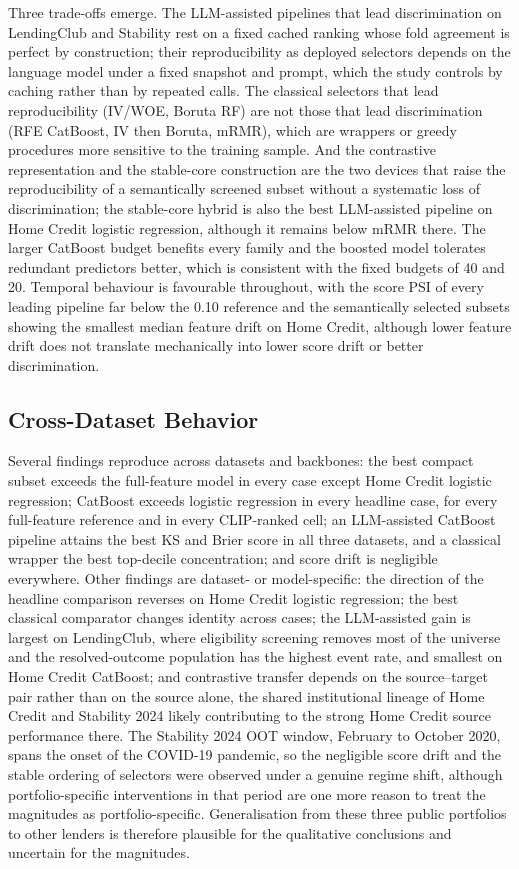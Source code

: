 \documentclass[final,5p,twocolumn]{elsarticle}
\begin{document}
Three trade-offs emerge. The LLM-assisted pipelines that lead discrimination on LendingClub and Stability rest on a fixed cached ranking whose fold agreement is perfect by construction; their reproducibility as deployed selectors depends on the language model under a fixed snapshot and prompt, which the study controls by caching rather than by repeated calls. The classical selectors that lead reproducibility (IV/WOE, Boruta RF) are not those that lead discrimination (RFE CatBoost, IV then Boruta, mRMR), which are wrappers or greedy procedures more sensitive to the training sample. And the contrastive representation and the stable-core construction are the two devices that raise the reproducibility of a semantically screened subset without a systematic loss of discrimination; the stable-core hybrid is also the best LLM-assisted pipeline on Home Credit logistic regression, although it remains below mRMR there. The larger CatBoost budget benefits every family and the boosted model tolerates redundant predictors better, which is consistent with the fixed budgets of 40 and 20. Temporal behaviour is favourable throughout, with the score PSI of every leading pipeline far below the 0.10 reference and the semantically selected subsets showing the smallest median feature drift on Home Credit, although lower feature drift does not translate mechanically into lower score drift or better discrimination.

\subsection{Cross-Dataset Behavior}
\label{subsec:cross_dataset}

Several findings reproduce across datasets and backbones: the best compact subset exceeds the full-feature model in every case except Home Credit logistic regression; CatBoost exceeds logistic regression in every headline case, for every full-feature reference and in every CLIP-ranked cell; an LLM-assisted CatBoost pipeline attains the best KS and Brier score in all three datasets, and a classical wrapper the best top-decile concentration; and score drift is negligible everywhere. Other findings are dataset- or model-specific: the direction of the headline comparison reverses on Home Credit logistic regression; the best classical comparator changes identity across cases; the LLM-assisted gain is largest on LendingClub, where eligibility screening removes most of the universe and the resolved-outcome population has the highest event rate, and smallest on Home Credit CatBoost; and contrastive transfer depends on the source--target pair rather than on the source alone, the shared institutional lineage of Home Credit and Stability 2024 likely contributing to the strong Home Credit source performance there. The Stability 2024 OOT window, February to October 2020, spans the onset of the COVID-19 pandemic, so the negligible score drift and the stable ordering of selectors were observed under a genuine regime shift, although portfolio-specific interventions in that period are one more reason to treat the magnitudes as portfolio-specific. Generalisation from these three public portfolios to other lenders is therefore plausible for the qualitative conclusions and uncertain for the magnitudes.
\end{document}
